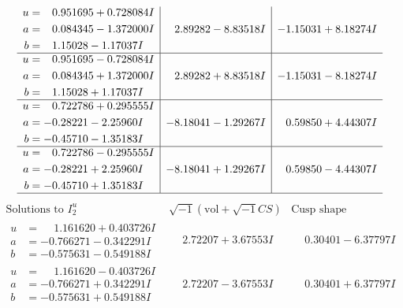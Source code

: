 \documentclass[1p]{elsarticle_modified}
\theoremstyle{definition}
\newcommand{\I}{\sqrt{-1}}
\begin{document}
$$\begin{array}{c|c|c}
\begin{aligned}
u &= \phantom{-}0.951695 + 0.728084 I \\
a &= \phantom{-}0.084345 - 1.372000 I \\
b &= \phantom{-}1.15028 - 1.17037 I\end{aligned}
 & \phantom{-}2.89282 - 8.83518 I & -1.15031 + 8.18274 I \\ \hline\begin{aligned}
u &= \phantom{-}0.951695 - 0.728084 I \\
a &= \phantom{-}0.084345 + 1.372000 I \\
b &= \phantom{-}1.15028 + 1.17037 I\end{aligned}
 & \phantom{-}2.89282 + 8.83518 I & -1.15031 - 8.18274 I \\ \hline\begin{aligned}
u &= \phantom{-}0.722786 + 0.295555 I \\
a &= -0.28221 - 2.25960 I \\
b &= -0.45710 - 1.35183 I\end{aligned}
 & -8.18041 - 1.29267 I & \phantom{-}0.59850 + 4.44307 I \\ \hline\begin{aligned}
u &= \phantom{-}0.722786 - 0.295555 I \\
a &= -0.28221 + 2.25960 I \\
b &= -0.45710 + 1.35183 I\end{aligned}
 & -8.18041 + 1.29267 I & \phantom{-}0.59850 - 4.44307 I\\
 \hline 
 \end{array}$$\newpage$$\begin{array}{c|c|c}  
\text{Solutions to }I^u_{2}& \I (\text{vol} + \sqrt{-1}CS) & \text{Cusp shape}\\
 \hline 
\begin{aligned}
u &= \phantom{-}1.161620 + 0.403726 I \\
a &= -0.766271 - 0.342291 I \\
b &= -0.575631 - 0.549188 I\end{aligned}
 & \phantom{-}2.72207 + 3.67553 I & \phantom{-}0.30401 - 6.37797 I \\ \hline\begin{aligned}
u &= \phantom{-}1.161620 - 0.403726 I \\
a &= -0.766271 + 0.342291 I \\
b &= -0.575631 + 0.549188 I\end{aligned}
 & \phantom{-}2.72207 - 3.67553 I & \phantom{-}0.30401 + 6.37797 I \\ \hline\begin{aligned}

\end{aligned}
\end{array}$$
\end{document}
